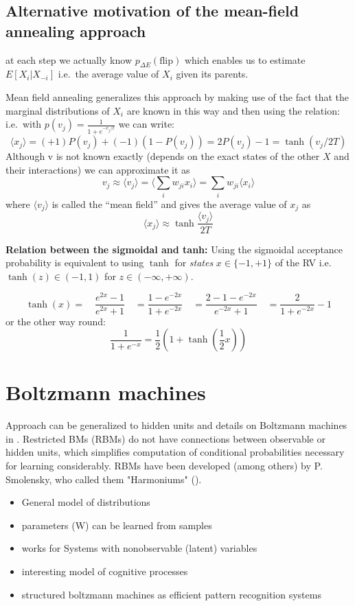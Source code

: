 \subsection{Alternative motivation of the mean-field annealing
  approach} \label{sec:motivation} at each step we actually know
$p_{\Delta E}(\mathrm{flip})$ which enables us to estimate
$E[X_i|X_{-i}]$ i.e.\ the average value of $X_i$ given its parents.

Mean field annealing generalizes this approach by making use of the fact that 
the marginal distributions of $X_i$ are known in this way and then using the relation: 
i.e.\ with $p(v_j) = \frac{1}{1+e^{-v_j/t}}$ we can write: 
$$
\langle x_j \rangle =  (+1) P(v_j) +(-1)(1-P(v_j)) = 2 P(v_j) -1 = \tanh(v_j/2T)
$$
Although v is not known exactly (depends on the exact states of the
other $X$ and their interactions) we can approximate it as
$$
v_j \approx \langle v_j \rangle = \Big\langle \sum_i w_{ji} x_i \Big\rangle = 
 \sum_i w_{ji}  \langle x_i \rangle 
$$
where $\langle v_j \rangle$ is called the ``mean field'' and gives the average value of $x_j$ as 
$$\langle x_j \rangle \approx \tanh\frac{\langle v_j\rangle}{2T}$$

\textbf{Relation between the sigmoidal and tanh:} Using the sigmoidal acceptance probability is equivalent to using $\tanh$ for \emph{states} $x \in \{-1,+1\}$  of the RV i.e.\ $\tanh(z) \in (-1,1)$ for $z \in (-\infty,+\infty)$. 

\begin{equation}
\tanh(x) = \quad\frac{e^{2x}-1}{e^{2x}+1} 
 \quad = \frac{1-e^{-2x}}{1+e^{-2x}} \quad = \frac{2-1-e^{-2x}}{e^{-2x}+1} \quad =  \frac{2}{1+e^{-2x}} -1 
\end{equation}
or the other way round: 
$$
\frac{1}{1+e^{-x}} = \frac{1}{2}\left(1+\tanh(\frac{1}{2}x)\right)
$$

\section{Boltzmann machines}
\label{sec:boltzmann-machines}

Approach can be generalized to hidden units and details on Boltzmann
machines in \cite{AartsKorst1990}. Restricted BMs (RBMs) do not have connections between observable or hidden units, which simplifies computation of conditional probabilities necessary for learning considerably. RBMs have been developed (among others) by P. Smolensky, who called them "Harmoniums" (\cite{Smolensky1986}). 
\begin{itemize}
\item General model of distributions
\item parameters (W) can be learned from samples
\item works for Systems with nonobservable (latent) variables 
\item interesting model of cognitive processes
\item structured boltzmann machines as efficient pattern recognition systems
\end{itemize}

